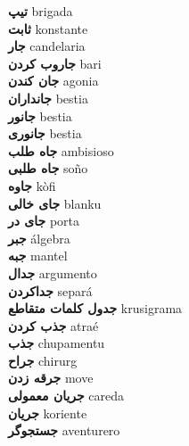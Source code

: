 \textbf{ تیپ  } brigada \\
\textbf{ ثابت  } konstante \\
\textbf{ جار  } candelaria \\
\textbf{ جاروب کردن  } bari \\
\textbf{ جان کندن  } agonia \\
\textbf{ جانداران  } bestia \\
\textbf{ جانور  } bestia \\
\textbf{ جانوری  } bestia \\
\textbf{ جاه طلب  } ambisioso \\
\textbf{ جاه طلبی  } soño \\
\textbf{ جاوه  } kòfi \\
\textbf{ جای خالی  } blanku \\
\textbf{ جای در  } porta \\
\textbf{ جبر  } álgebra \\
\textbf{ جبه  } mantel \\
\textbf{ جدال  } argumento \\
\textbf{ جداکردن  } separá \\
\textbf{ جدول کلمات متقاطع  } krusigrama \\
\textbf{ جذب کردن  } atraé \\
\textbf{ جذب  } chupamentu \\
\textbf{ جراح  } chirurg \\
\textbf{ جرقه زدن  } move \\
\textbf{ جریان معمولی  } careda \\
\textbf{ جریان  } koriente \\
\textbf{ جستجوگر  } aventurero \\
